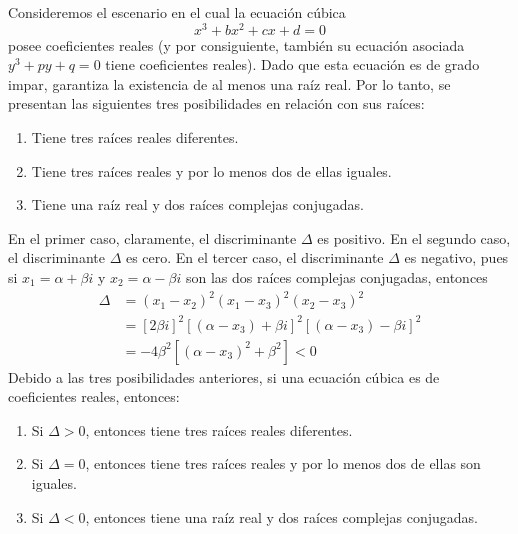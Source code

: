 \begin{observation}
    Consideremos el escenario en el cual la ecuación cúbica
    $$x^3+bx^2+cx+d=0$$
    posee coeficientes reales (y por consiguiente, también su ecuación asociada $y^3 + py + q=0$ tiene coeficientes reales). Dado que esta ecuación es de grado impar, garantiza la existencia de al menos una raíz real. Por lo tanto, se presentan las siguientes tres posibilidades en relación con sus raíces:\newpage
    \begin{enumerate}[label=\roman*.]
        \item Tiene tres raíces reales diferentes.
        \item Tiene tres raíces reales y por lo menos dos de ellas iguales.
        \item Tiene una raíz real y dos raíces complejas conjugadas.
    \end{enumerate}
    En el primer caso, claramente, el discriminante $\Delta$ es positivo. En el segundo caso, el discriminante $\Delta$ es cero. En el tercer caso, el discriminante $\Delta$ es negativo, pues si $x_1=\alpha + \beta i$ y $x_2=\alpha - \beta i$ son las dos raíces complejas conjugadas, entonces
    \begin{align*}
        \Delta &=(x_1-x_2)^2 (x_1-x_3)^2 (x_2-x_3)^2 \\ 
        &= [2 \beta i]^2 [(\alpha - x_3)+\beta i]^2[(\alpha -x_3)-\beta i]^2 \\ 
        &=-4 \beta^2 \left[ (\alpha - x_3)^2+\beta^2 \right] <0
    \end{align*}
    Debido a las tres posibilidades anteriores, si una ecuación cúbica es de coeficientes reales, entonces:
    \begin{enumerate}[label=\roman*.]
        \item Si $\Delta >0$, entonces tiene tres raíces reales diferentes.
        \item Si $\Delta =0$, entonces tiene tres raíces reales y por lo menos dos de ellas son iguales.
        \item Si $\Delta <0$, entonces tiene una raíz real y dos raíces complejas conjugadas.
    \end{enumerate}
\end{observation}

